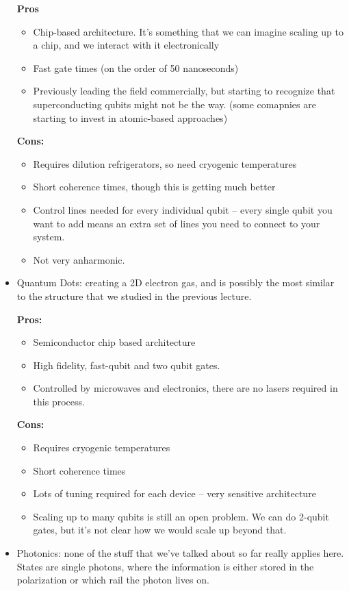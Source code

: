 \begin{itemize}
		\textbf{Pros}
		\begin{itemize}
			\item Chip-based architecture. It's something that we can imagine scaling up to a chip, and we interact 
				with it electronically
			\item Fast gate times (on the order of 50 nanoseconds)
			\item Previously leading the field commercially, but starting to recognize that superconducting 
				qubits might not be the way. (some comapnies are starting to invest in atomic-based approaches)  
		\end{itemize}

		\textbf{Cons:}
		\begin{itemize}
			\item Requires dilution refrigerators, so need cryogenic temperatures 
			\item Short coherence times, though this is getting much better 
			\item Control lines needed for every individual qubit -- every single qubit you want to add means an 
				extra set of lines you need to connect to your system. 
			\item Not very anharmonic. 
		\end{itemize}
	\item Quantum Dots: creating a 2D electron gas, and is possibly the most similar to the structure that we studied 
		in the previous lecture. 
		
		\textbf{Pros:}
		\begin{itemize}
			\item Semiconductor chip based architecture
			\item High fidelity, fast-qubit and two qubit gates. 
			\item Controlled by microwaves and electronics, there are no lasers required in this process. 
		\end{itemize}
		
		\textbf{Cons:}
		\begin{itemize}
			\item Requires cryogenic temperatures
			\item Short coherence times 
			\item Lots of tuning required for each device -- very sensitive architecture
			\item Scaling up to many qubits is still an open problem. We can do 2-qubit gates, but it's not clear 
				how we would scale up beyond that. 
		\end{itemize}
	\item Photonics: none of the stuff that we've talked about so far really applies here. States are single 
		photons, where the information is either stored in the polarization or which rail the photon 
		lives on. 
		

\end{itemize}
